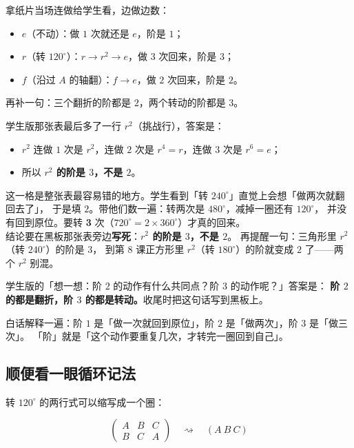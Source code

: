 \begin{caozuo}
  拿纸片当场连做给学生看，边做边数：
  \begin{itemize}
    \item \(e\)（不动）：做 \(1\) 次就还是 \(e\)，阶是 \(1\)；
    \item \(r\)（转 \(120^\circ\)）：\(r\to r^2\to e\)，做 \(3\) 次回来，阶是 \(3\)；
    \item \(f\)（沿过 \(A\) 的轴翻）：\(f\to e\)，做 \(2\) 次回来，阶是 \(2\)。
  \end{itemize}
  再补一句：三个翻折的阶都是 \(2\)，两个转动的阶都是 \(3\)。
\end{caozuo}

\noindent 学生版那张表最后多了一行 \(r^2\)（挑战行），答案是：

\begin{itemize}
  \item \(r^2\) 连做 \(1\) 次是 \(r^2\)，连做 \(2\) 次是 \(r^4=r\)，连做 \(3\) 次是 \(r^6=e\)；
  \item 所以 \textbf{\(r^2\) 的阶是 \(3\)，不是 \(2\)}。
\end{itemize}

\begin{zhu}
  这一格是整张表最容易错的地方。学生看到「转 \(240^\circ\)」直觉上会想「做两次就翻回去了」，
  于是填 \(2\)。带他们数一遍：转两次是 \(480^\circ\)，减掉一圈还有 \(120^\circ\)，
  并没有回到原位。要转 \textbf{3} 次（\(720^\circ=2\times360^\circ\)）才真的回来。\\[3pt]
  结论要在黑板那张表旁边\textbf{写死}：\textbf{\(r^2\) 的阶是 \(3\)，不是 \(2\)}。
  再提醒一句：三角形里 \(r^2\)（转 \(240^\circ\)）的阶是 \(3\)，
  到第 8 课正方形里 \(r^2\)（转 \(180^\circ\)）的阶就变成 \(2\) 了——两个 \(r^2\) 别混。
\end{zhu}

\noindent 学生版的「想一想：阶 \(2\) 的动作有什么共同点？阶 \(3\) 的动作呢？」答案是：
\textbf{阶 \(2\) 的都是翻折，阶 \(3\) 的都是转动。}收尾时把这句话写到黑板上。

白话解释一遍：阶 \(1\) 是「做一次就回到原位」，阶 \(2\) 是「做两次」，阶 \(3\) 是「做三次」。
「阶」就是「这个动作要重复几次，才转完一圈回到自己」。

\subsection*{顺便看一眼循环记法}

转 \(120^\circ\) 的两行式可以缩写成一个圈：

\[
  \begin{pmatrix}A&B&C\\B&C&A\end{pmatrix}
  \quad\rightsquigarrow\quad
  (A\ B\ C)
\]

